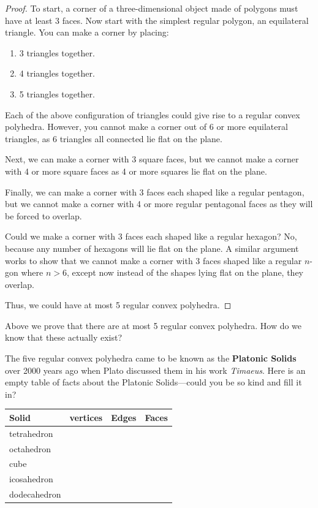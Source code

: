 \begin{proof} 
To start, a corner of a three-dimensional object made of polygons must
have at least 3 faces. Now start with the simplest regular polygon, an
equilateral triangle. You can make a corner by placing:
\begin{enumerate}
\item 3 triangles together.
\item 4 triangles together.
\item 5 triangles together.
\end{enumerate}
Each of the above configuration of triangles could give rise to a
regular convex polyhedra.  However, you cannot make a corner out of 6
or more equilateral triangles, as 6 triangles all connected lie flat
on the plane.

Next, we can make a corner with 3 square faces, but we cannot make a
corner with 4 or more square faces as 4 or more squares lie flat on
the plane.

Finally, we can make a corner with 3 faces each shaped like a regular
pentagon, but we cannot make a corner with 4 or more regular
pentagonal faces as they will be forced to overlap.

Could we make a corner with 3 faces each shaped like a regular
hexagon? No, because any number of hexagons will lie flat on the
plane. A similar argument works to show that we cannot make a corner
with 3 faces shaped like a regular $n$-gon where $n>6$, except now
instead of the shapes lying flat on the plane, they overlap.

Thus, we could have at most 5 regular convex polyhedra.
\end{proof}

\begin{ques}
Above we prove that there are at most 5 regular convex polyhedra. How
do we know that these actually exist?
\end{ques}
\QM

The five regular convex polyhedra came to be known as the
\textbf{Platonic Solids} over 2000 years ago
when Plato discussed them in his work \textit{Timaeus}. Here is an
empty table of facts about the Platonic Solids---could you be so kind
and fill it in?
\begin{center}
{
\renewcommand{\arraystretch}{1.5}
\begin{tabular}{|l|c|c|c|}\hline
Solid & vertices & Edges & Faces\\
\hline\hline
tetrahedron &  &   &   \\ \hline
octahedron &   &  &   \\ \hline
cube &  &   &  \\ \hline
icosahedron &  &  &  \\ \hline
dodecahedron &  &  &  \\ \hline
\end{tabular}}
\end{center}


